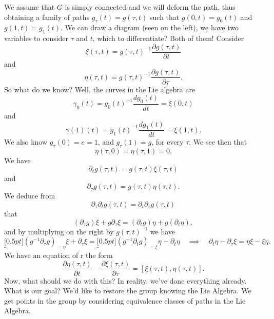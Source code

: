 \noindent\ignorespaces{}We assume that $G$ is simply connected
and we will deform the path, thus obtaining a family of paths
$g_{\tau}(t)=g(\tau,t)$ such that $g(0,t)=g_{0}(t)$ and
$g(1,t)=g_{1}(t)$. We can draw a diagram (seen on the left), we
have two variables to consider $\tau$ and $t$, which to
differentiate?  Both of them! Consider
\begin{equation}
\xi(\tau,t)=g(\tau,t)^{-1}\frac{\partial g(\tau,t)}{\partial t}
\end{equation}
and
\begin{equation}
\eta(\tau,t)=g(\tau,t)^{-1}\frac{\partial g(\tau,t)}{\partial\tau}.
\end{equation}
So what do we know? Well, the curves in the Lie algebra are
\begin{equation}
\gamma_{0}(t) = g_{0}(t)^{-1}\frac{dg_{0}(t)}{dt}=\xi(0,t)
\end{equation}
and
\begin{equation}
\gamma(1)(t) = g_{1}(t)^{-1}\frac{dg_{1}(t)}{dt}=\xi(1,t).
\end{equation}
We also know $g_{\tau}(0)=e=1$, and $g_{\tau}(1)=g$, for every
$\tau$. We see then that
\begin{equation}
\eta(\tau,0)=\eta(\tau,1)=0.
\end{equation}
We have
\begin{equation}
\partial_{t}g(\tau,t)=g(\tau,t)\xi(\tau,t)
\end{equation}
and
\begin{equation}
\partial_{\tau}g(\tau,t)=g(\tau,t)\eta(\tau,t).
\end{equation}
We deduce from
\begin{equation}
\partial_{\tau}\partial_{t}g(\tau,t)=\partial_{t}\partial_{\tau}g(\tau,t)
\end{equation}
that
\begin{equation}
(\partial_{\tau}g)\xi+g\partial_{\tau}\xi=(\partial_{t}g)\eta+g(\partial_{t}\eta),
\end{equation}
and by multiplying on the right by $g(\tau,t)^{-1}$ we have
\begin{equation}
\underbracket[0.5pt]{(g^{-1}\partial_{\tau}g)}_{=\eta}\xi+\partial_{\tau}\xi=\underbracket[0.5pt]{(g^{-1}\partial_{t}g)}_{=\xi}\eta+\partial_{t}\eta\quad\implies\quad
\partial_{t}\eta-\partial_{\tau}\xi=\eta\xi-\xi\eta.
\end{equation}
We have an equation of r the form
\begin{equation}
\frac{\partial\eta(\tau,t)}{\partial t}-\frac{\partial\xi(\tau,t)}{\partial\tau}
=[\xi(\tau,t),\eta(\tau,t)].
\end{equation}
Now, what should we do with this? In reality, we've done
everything already. What is our goal? We'd like to restore the
group knowing the Lie Algebra. We get points in the group by
considering equivalence classes of paths in the Lie Algebra.

